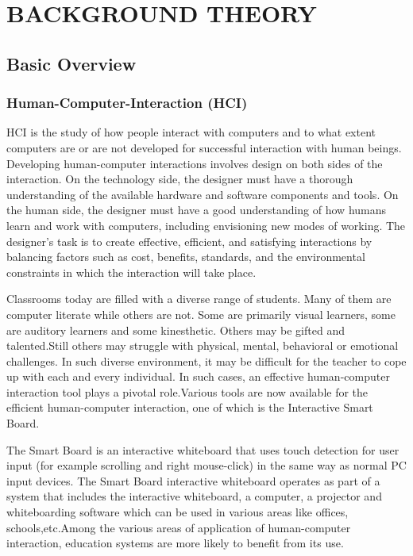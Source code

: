 \documentclass[12pt, a4paper]{article}
\begin{document}
\newpage
\section{BACKGROUND THEORY}
\subsection{Basic Overview}
\subsubsection{Human-Computer-Interaction (HCI)} 
HCI is the study of how people interact with computers and to what extent computers are or are not developed for successful interaction with human beings. Developing human-computer interactions involves design on both sides of the interaction. On the technology side, the designer must have a thorough understanding of the available hardware and software components and tools. On the human side, the designer must have a good understanding of how humans learn and work with computers, including envisioning new modes of working. The designer's task is to create effective, efficient, and satisfying interactions by balancing factors such as cost, benefits, standards, and the environmental constraints in which the interaction will take place. 

Classrooms today are filled with a diverse range of students. Many of them are computer literate while others are not. Some are primarily visual learners, some are auditory learners and some kinesthetic. Others may be gifted and talented.Still others may struggle with physical, mental, behavioral or emotional challenges. In such diverse environment, it may be difficult for the teacher to cope up with each and every individual. In such cases, an effective human-computer interaction tool plays a pivotal role.Various tools are now available for the efficient human-computer interaction, one of which is the Interactive Smart Board.

The Smart Board is an interactive whiteboard that uses touch detection for user input (for example scrolling and right mouse-click) in the same way as normal PC input devices. The Smart Board interactive whiteboard operates as part of a system that includes the interactive whiteboard, a computer, a projector and whiteboarding software which can be used in various areas like offices, schools,etc.Among the various areas of application of human-computer interaction, education systems are more likely to benefit from its use.
\end{document}

